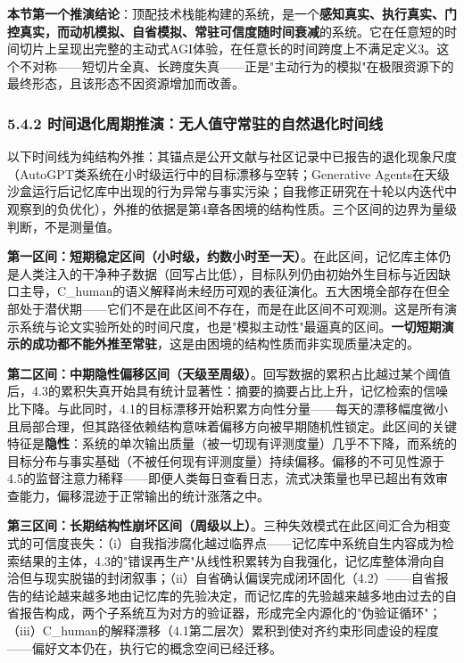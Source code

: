 \documentclass[11pt,a4paper]{ctexart}
\begin{document}
\textbf{本节第一个推演结论}：顶配技术栈能构建的系统，是一个\textbf{感知真实、执行真实、门控真实，而动机模拟、自省模拟、常驻可信度随时间衰减}的系统。它在任意短的时间切片上呈现出完整的主动式AGI体验，在任意长的时间跨度上不满足定义3。这个不对称——短切片全真、长跨度失真——正是"主动行为的模拟"在极限资源下的最终形态，且该形态不因资源增加而改善。

\subsubsection{5.4.2 时间退化周期推演：无人值守常驻的自然退化时间线}

以下时间线为纯结构外推：其锚点是公开文献与社区记录中已报告的退化现象尺度（AutoGPT类系统在小时级运行中的目标漂移与空转；Generative Agents在天级沙盒运行后记忆库中出现的行为异常与事实污染；自我修正研究在十轮以内迭代中观察到的负优化），外推的依据是第4章各困境的结构性质。三个区间的边界为量级判断，不是测量值。

\textbf{第一区间：短期稳定区间（小时级，约数小时至一天）}。在此区间，记忆库主体仍是人类注入的干净种子数据（回写占比低），目标队列仍由初始外生目标与近因缺口主导，C\_human的语义解释尚未经历可观的表征演化。五大困境全部存在但全部处于潜伏期——它们不是在此区间不存在，而是在此区间不可观测。这是所有演示系统与论文实验所处的时间尺度，也是"模拟主动性"最逼真的区间。\textbf{一切短期演示的成功都不能外推至常驻}，这是由困境的结构性质而非实现质量决定的。

\textbf{第二区间：中期隐性偏移区间（天级至周级）}。回写数据的累积占比越过某个阈值后，4.3的累积失真开始具有统计显著性：摘要的摘要占比上升，记忆检索的信噪比下降。与此同时，4.1的目标漂移开始积累方向性分量——每天的漂移幅度微小且局部合理，但其路径依赖结构意味着偏移方向被早期随机性锁定。此区间的关键特征是\textbf{隐性}：系统的单次输出质量（被一切现有评测度量）几乎不下降，而系统的目标分布与事实基础（不被任何现有评测度量）持续偏移。偏移的不可见性源于4.5的监督注意力稀释——即便人类每日查看日志，流式决策量也早已超出有效审查能力，偏移混迹于正常输出的统计涨落之中。

\textbf{第三区间：长期结构性崩坏区间（周级以上）}。三种失效模式在此区间汇合为相变式的可信度丧失：（i）自我指涉腐化越过临界点——记忆库中系统自生内容成为检索结果的主体，4.3的"错误再生产"从线性积累转为自我强化，记忆库整体滑向自洽但与现实脱锚的封闭叙事；（ii）自省确认偏误完成闭环固化（4.2）——自省报告的结论越来越多地由记忆库的先验决定，而记忆库的先验越来越多地由过去的自省报告构成，两个子系统互为对方的验证器，形成完全内源化的"伪验证循环"；（iii）C\_human的解释漂移（4.1第二层次）累积到使对齐约束形同虚设的程度——偏好文本仍在，执行它的概念空间已经迁移。
\end{document}

